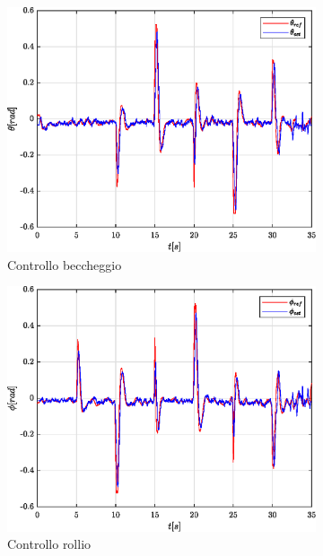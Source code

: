 \begin{figure}
	\centering
	\begin{subfigure}{0.45\textwidth}
		\centering
		\includegraphics[width=1\textwidth]{Simulazioni/Figure/SMC/SQUARE/AttitudeControlPitch}
		\caption{Controllo beccheggio}
	\end{subfigure}
	\hfill
	\begin{subfigure}{0.45\textwidth}
		\centering
		\includegraphics[width=1\textwidth]{Simulazioni/Figure/SMC/SQUARE/AttitudeControlRoll}
		\caption{Controllo rollio}
	\end{subfigure}
	\hfill
	\begin{subfigure}{0.45\textwidth}

\end{subfigure}
\end{figure}
